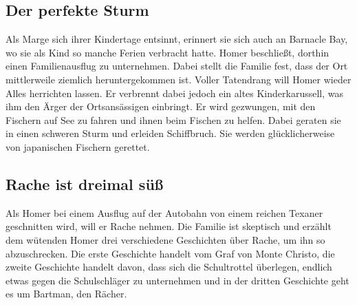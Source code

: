 \subsection{Der perfekte Sturm}
Als Marge sich ihrer Kindertage entsinnt, erinnert sie sich auch an Barnacle Bay, wo sie als Kind so manche Ferien verbracht hatte. Homer beschließt, dorthin einen Familienausflug zu unternehmen. Dabei stellt die Familie fest, dass der Ort mittlerweile ziemlich heruntergekommen ist. Voller Tatendrang will Homer wieder Alles herrichten lassen. Er verbrennt dabei jedoch ein altes Kinderkarussell, was ihm den Ärger der Ortsansässigen einbringt. Er wird gezwungen, mit den Fischern auf See zu fahren und ihnen beim Fischen zu helfen. Dabei geraten sie in einen schweren Sturm und erleiden Schiffbruch. Sie werden glücklicherweise von japanischen Fischern gerettet.



\subsection{Rache ist dreimal süß}\label{JABF05}
Als Homer bei einem Ausflug auf der Autobahn von einem reichen Texaner geschnitten wird, will er Rache nehmen. Die Familie ist skeptisch und erzählt dem wütenden Homer drei verschiedene Geschichten über Rache, um ihn so abzuschrecken. Die erste Geschichte handelt vom Graf von Monte Christo, die zweite Geschichte handelt davon, dass sich die Schultrottel überlegen, endlich etwas gegen die Schulschläger zu unternehmen und in der dritten Geschichte geht es um Bartman, den Rächer.

